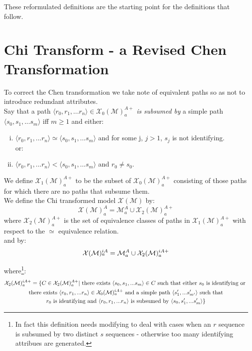 \documentclass[10pt,a4paper]{article}
\newcommand{\genericmodel}{\mathcal{M}}
\newcommand{\logtophys}{\mathcal{X}}
\newcommand{\chen}{\mathcal{X}_0}
\newcommand{\chigenericmodel}{\logtophys(\genericmodel)}
\newcommand{\allAttrs}{\genericmodel^A}
\newcommand{\attrs}[1]{\allAttrs_{#1}}
\newcommand{\chenFKattrs}[1]{\chen(\genericmodel)^{A+}_{#1}}
\newcommand{\chenFKidAttrs}[1]{\chen(\genericmodel)^{iA+}_{\raisebox{2pt}{$\scriptstyle{#1}$}}}
\newcommand{\chiOne}[1]{{\mathcal{X}_1}(\genericmodel)^{A+}_{#1}}
\newcommand{\chenFKclasses}[1]{{\mathcal{X}_2}(\genericmodel)^{A+}_{#1}}
\newcommand{\chenFKidClasses}[1]{{\mathcal{X}_2}(\genericmodel)^{iA+}_{#1}}
\newcommand{\chiAttrs}[1]{\logtophys(\genericmodel)^A_{#1}}
\newcommand{\chiIdAttrs}[1]{\logtophys(\genericmodel)^{iA}_{\raisebox{2pt}{$\scriptstyle{#1}$}}}
\begin{document}
\noindent These reformulated definitions are the starting point for the definitions that follow.

\section{Chi Transform - a Revised Chen Transformation}

\newcommand{\pathclasses}[1]{\chenFKattrs{#1}\hspace{-1pt}/\hspace{-2pt}\simeq}

\noindent To correct the Chen transformation we take note of equivalent paths so as not to introduce redundant attributes. \\

\noindent
Say that a path $\langle r_0,r_1,...r_n \rangle \in \chenFKattrs{a}$ \textit{is subsumed by} a simple path 
$\langle s_0,s_1,...s_m \rangle$ iff $m \geq 1$ and either:
\begin{enumerate} [(i)]

\item $\langle r_0,r_1,...r_n \rangle \simeq  \langle s_0,s_1,...s_m \rangle$ and for some j, $j > 1$,
$s_j$ is not identifying. \\

 \hspace{1cm} or:
\item $\langle r_0,r_1,...r_n \rangle <  \langle s_0,s_1,...s_m \rangle$ and $r_0 \neq s_0$.
\end{enumerate}

\noindent
We define $\chiOne{a}$ to be the subset of $\chenFKattrs{a}$ consisting of those paths for which there are no paths that subsume them. \\
 

\noindent We define the Chi transformed model $\chigenericmodel$ by:
$$
\chiAttrs{a} = \attrs{a} \cup \chenFKclasses{a}
$$
\noindent where $\chenFKclasses{a}$ is the set of equivalence classes of paths in $\chiOne{a}$
with respect to the $\simeq$ equivalence relation. \\ 

\noindent and by:
$$
\chiIdAttrs{a} = \attrs{a} \cup \chenFKidClasses{a}
$$

\noindent where\footnote{In fact this definition needs modifying to deal with cases when an $r$ sequence is subsumed by two distinct
$s$ sequences - otherwise too many identifying attribues are generated. %
}:
\begin{multline}
\chenFKidClasses{a} = 
\{ C \in \chenFKclasses{a} | \mbox{ there exists }
\langle s_0, s_1,...s_m \rangle \in C \mbox{ such that either }
 s_0 \mbox{ is identifying or } \\
 \mbox { there exists } \langle r_0, r_1,...r_n \rangle \in \chenFKidAttrs{a} \mbox{ and a simple path }  \langle s'_1,...s'_{m'} \rangle \mbox{ such that } \\
r_0
\mbox{ is identifying and }    
\langle r_0,r_1,...r_n \rangle \mbox{ is subsumed by } \langle s_0, s'_1,...s'_{m} \rangle  \}
\end{multline}
\end{document}
